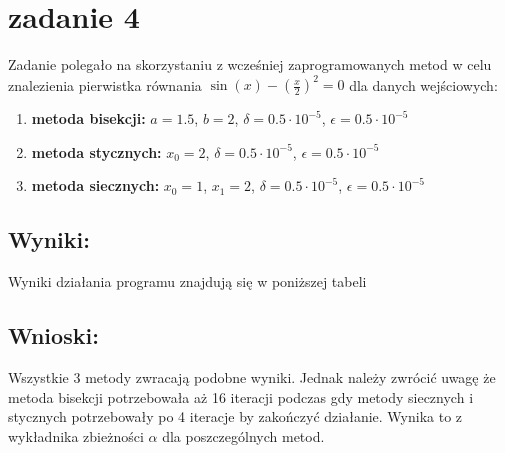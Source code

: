 \section{zadanie 4}
Zadanie polegało na skorzystaniu z wcześniej zaprogramowanych metod w celu znalezienia pierwistka równania \(\sin(x) - (\frac{x}{2})^2 = 0\) dla danych wejściowych:
\begin{enumerate}
  \item \textbf{metoda bisekcji:} \(a = 1.5\), \(b = 2\), \(\delta = 0.5 \cdot 10^{-5}\), \(\epsilon = 0.5 \cdot 10^{-5}\)
  \item \textbf{metoda stycznych:} \(x_0 = 2\), \(\delta = 0.5 \cdot 10^{-5}\), \(\epsilon = 0.5 \cdot 10^{-5}\)
  \item \textbf{metoda siecznych:} \(x_0 = 1\), \(x_1 = 2\), \(\delta = 0.5 \cdot 10^{-5}\), \(\epsilon = 0.5 \cdot 10^{-5}\)
\end{enumerate}

\subsection{Wyniki:}
Wyniki działania programu znajdują się w poniższej tabeli
\begin{table}[ht]
    \caption{wartości z wyjścia programu \textbf{zadanie4.jl}}

\end{table}

\subsection{Wnioski:}
Wszystkie 3 metody zwracają podobne wyniki. Jednak należy zwrócić uwagę że metoda bisekcji potrzebowała aż 16 iteracji podczas gdy metody siecznych i stycznych potrzebowały po 4 iteracje by zakończyć działanie. Wynika to z wykładnika zbieżności \( \alpha\) dla poszczególnych metod.

